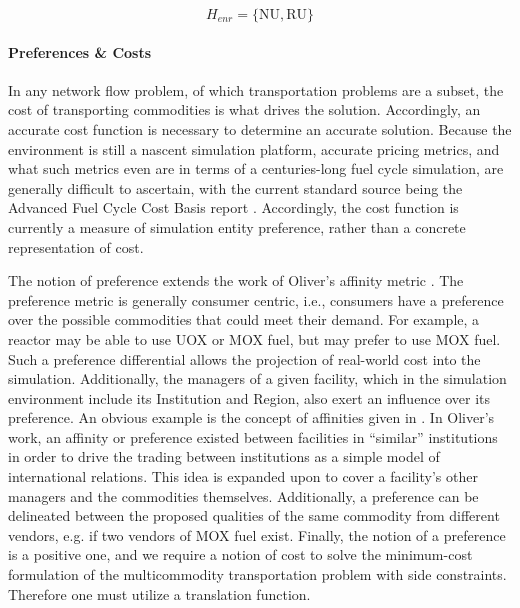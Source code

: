 \begin{equation}\label{eqs:enr-dem-commods}
  H_{enr} = \{ \mbox{NU}, \mbox{RU} \}
\end{equation}

\paragraph{Preferences \& Costs}

In any network flow problem, of which transportation problems are a subset, the
cost of transporting commodities is what drives the solution. Accordingly, an
accurate cost function is necessary to determine an accurate solution. Because
the \Cyclus environment is still a nascent simulation platform, accurate pricing
metrics, and what such metrics even are in terms of a centuries-long fuel cycle
simulation, are generally difficult to ascertain, with the current standard source
being the Advanced Fuel Cycle Cost Basis
report \cite{shropshire_advanced_2009}. Accordingly, the cost function is
currently a measure of simulation entity preference, rather than a concrete
representation of cost.

The notion of preference extends the work of Oliver's affinity metric
\cite{oliver_geniusv2:_2009}. The preference metric is generally consumer
centric, i.e., consumers have a preference over the possible commodities that
could meet their demand. For example, a reactor may be able to use UOX or MOX
fuel, but may prefer to use MOX fuel. Such a preference differential allows the
projection of real-world cost into the simulation. Additionally, the managers of
a given facility, which in the \Cyclus simulation environment include its
Institution and Region, also exert an influence over its preference. An obvious
example is the concept of affinities given in \cite{oliver_geniusv2:_2009}. In
Oliver's work, an affinity or preference existed between facilities in
``similar'' institutions in order to drive the trading between institutions as a
simple model of international relations. This idea is expanded upon to cover a
facility's other managers and the commodities themselves. Additionally, a
preference can be delineated between the proposed qualities of the same
commodity from different vendors, e.g. if two vendors of MOX fuel
exist. Finally, the notion of a preference is a positive one, and we require a
notion of cost to solve the minimum-cost formulation of the multicommodity
transportation problem with side constraints. Therefore one must utilize a
translation function.

